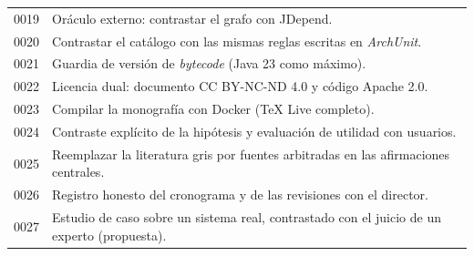 \begin{table}[H]
\begin{tabularx}{\textwidth}{lX}
0019 & Oráculo externo: contrastar el grafo con JDepend. \\
0020 & Contrastar el catálogo con las mismas reglas escritas en \textit{ArchUnit}. \\
0021 & Guardia de versión de \textit{bytecode} (Java 23 como máximo). \\
0022 & Licencia dual: documento CC BY-NC-ND 4.0 y código Apache 2.0. \\
0023 & Compilar la monografía con Docker (TeX Live completo). \\
0024 & Contraste explícito de la hipótesis y evaluación de utilidad con usuarios. \\
0025 & Reemplazar la literatura gris por fuentes arbitradas en las afirmaciones centrales. \\
0026 & Registro honesto del cronograma y de las revisiones con el director. \\
0027 & Estudio de caso sobre un sistema real, contrastado con el juicio de un experto (propuesta). \\
\bottomrule
\end{tabularx}
\end{table}
